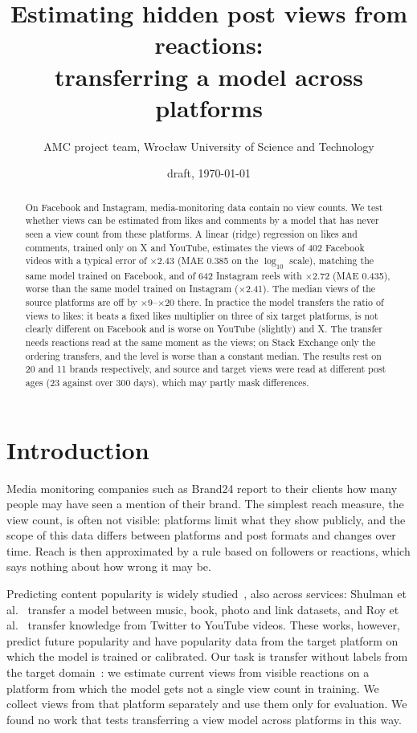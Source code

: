 \documentclass[10pt,a4paper]{article}
\title{Estimating hidden post views from reactions:\\transferring a model across platforms}
\author{AMC project team, Wroc{\l}aw University of Science and Technology}
\date{draft, \today}
\newcommand{\x}[1]{$\times$#1}
\begin{document}
\maketitle

\begin{abstract}
On Facebook and Instagram, media-monitoring data contain no view counts. We test whether views can be estimated from
likes and comments by a model that has never seen a view count from these platforms. A linear (ridge) regression on likes and comments, trained only on X and YouTube, estimates the views of 402 Facebook videos with a typical error of \x{2.43}
(MAE 0.385 on the $\log_{10}$ scale), matching the same model trained on Facebook, and of 642 Instagram reels with \x{2.72} (MAE 0.435), worse than the same model trained on Instagram (\x{2.41}). The median views of the source platforms are off by
\x{9}--\x{20} there. In practice the model transfers the ratio of views to likes: it beats a fixed likes multiplier on
three of six target platforms, is not clearly different on Facebook and is worse on YouTube (slightly) and X. The transfer needs reactions read at the same
moment as the views; on Stack Exchange only the ordering transfers, and the level is worse than a constant median. The
results rest on 20 and 11 brands respectively, and source and target views were read at different post ages (23 against
over 300 days), which may partly mask differences.
\end{abstract}


\section{Introduction}

Media monitoring companies such as Brand24 report to their clients how many people may have seen a mention of their
brand. The simplest reach measure, the view count, is often not visible: platforms limit what they show publicly, and
the scope of this data differs between platforms and post formats and changes over time. Reach is then approximated
by a rule based on followers or reactions, which says nothing about how wrong it may be.

Predicting content popularity is widely studied~\cite{tatar2014}, also across services: Shulman et
al.~\cite{shulman2016} transfer a model between music, book, photo and link datasets, and Roy et al.~\cite{roy2013}
transfer knowledge from Twitter to YouTube videos. These works, however, predict future popularity and have popularity
data from the target platform on which the model is trained or calibrated. Our task is transfer without labels from the
target domain~\cite{bendavid2010}: we estimate current views from visible reactions on a platform from which the model
gets not a single view count in training. We collect views from that platform separately and use them only for
evaluation. We found no work that tests transferring a view model across platforms in this way.
\end{document}
